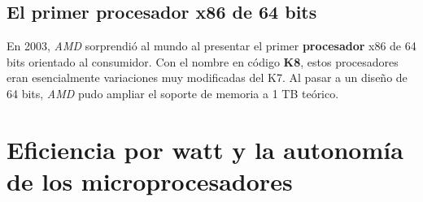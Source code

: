 \subsection{El primer \textbf{procesador} x86 de 64 bits}
En 2003, \emph{AMD} sorprendió al mundo al presentar el primer \textbf{procesador} x86 de 64 bits orientado al consumidor. Con el nombre en código \textbf{K8}, estos procesadores eran
esencialmente variaciones muy modificadas del K7. Al pasar a un diseño de 64 bits, \emph{AMD} pudo ampliar el soporte de memoria a 1 TB teórico.

\section{Eficiencia por watt y la autonomía de los microprocesadores}
